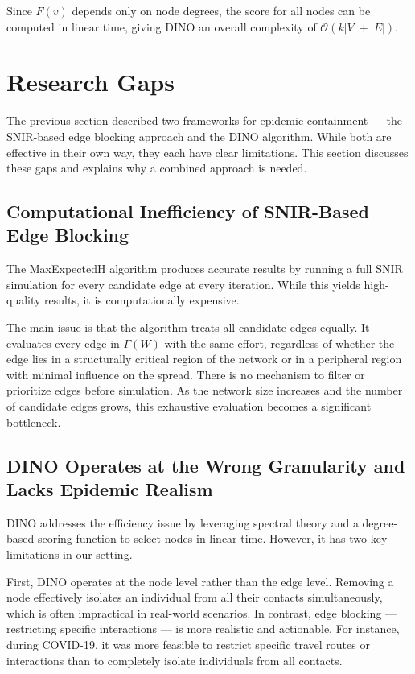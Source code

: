 \documentclass[conference]{IEEEtran}
\begin{document}
Since $F(v)$ depends only on node degrees, the score for all nodes can be computed in linear time, giving DINO an overall complexity of $\mathcal{O}(k|V| + |E|)$.


\section{Research Gaps}

The previous section described two frameworks for epidemic containment --- the SNIR-based edge blocking approach and the DINO algorithm. While both are effective in their own way, they each have clear limitations. This section discusses these gaps and explains why a combined approach is needed.

\subsection{Computational Inefficiency of SNIR-Based Edge Blocking}

The MaxExpectedH algorithm produces accurate results by running a full SNIR simulation for every candidate edge at every iteration. While this yields high-quality results, it is computationally expensive.

The main issue is that the algorithm treats all candidate edges equally. It evaluates every edge in $\Gamma(W)$ with the same effort, regardless of whether the edge lies in a structurally critical region of the network or in a peripheral region with minimal influence on the spread. There is no mechanism to filter or prioritize edges before simulation. As the network size increases and the number of candidate edges grows, this exhaustive evaluation becomes a significant bottleneck.

\subsection{DINO Operates at the Wrong Granularity and Lacks Epidemic Realism}

DINO addresses the efficiency issue by leveraging spectral theory and a degree-based scoring function to select nodes in linear time. However, it has two key limitations in our setting.

First, DINO operates at the node level rather than the edge level. Removing a node effectively isolates an individual from all their contacts simultaneously, which is often impractical in real-world scenarios. In contrast, edge blocking --- restricting specific interactions --- is more realistic and actionable. For instance, during COVID-19, it was more feasible to restrict specific travel routes or interactions than to completely isolate individuals from all contacts.
\end{document}
